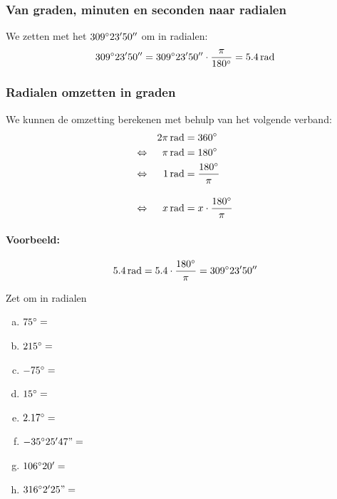 \documentclass[a4paper,12pt,twoside]{article}
\begin{document}
\subsubsection*{Van graden, minuten en seconden naar radialen}

We zetten met het  $309^\circ 23' 50''$ om in radialen:
$$309\degree 23' 50''=309\degree 23' 50''\cdot \dfrac{\pi}{180\degree}=5.4\rad$$

\subsubsection*{Radialen omzetten in graden}
We kunnen de omzetting berekenen met behulp van het volgende verband:
\begin{alignat*}{2}
     &&2\pi\rad &=360\degree\\
\lra &&\pi \rad &=180\degree\\
\lra &&  1 \rad &= \frac{180\degree}{\pi}\\[1em]
\lra &&  x \rad &= x\cdot\frac{180\degree}{\pi}
\end{alignat*}

\paragraph{Voorbeeld:}
$$5.4 \rad=5.4\cdot\dfrac{180\degree}{\pi}=309\degree 23' 50''$$

\begin{oefening} Zet om in radialen
\begin{multicols}{2}
\begin{enumerate}[(a)]
  \itemsep1em
  \item $75^\circ=$\arulefill
  \item $215^\circ=$\arulefill
  \item $-75^\circ=$\arulefill
  \item $15^\circ=$\arulefill
  \item $2.17^\circ=$\arulefill
  \item $-35^\circ25'47"=$\arulefill
  \item $106^\circ20'=$\arulefill
  \item $316^\circ2'25"=$\arulefill
\end{enumerate}
\end{multicols}
\end{oefening}
\end{document}
